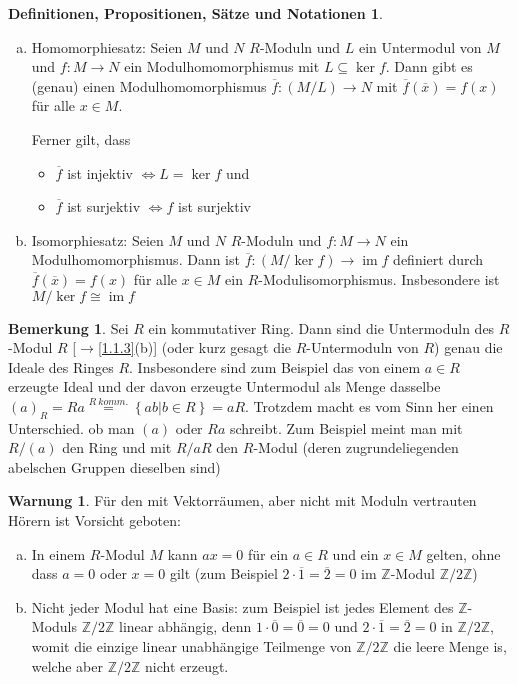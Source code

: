 \documentclass[
twoside=semi,
fontsize=12,
DIV=12, 
cleardoublepage=current,
leqno,
headings=optiontoheadandtoc, 
toc=idx
]{scrbook}
\newcommand{\Z}{\mathbb{Z}}
\newcommand{\set}[1]{\left\{ #1 \right\}}
\DeclareMathOperator{\im}{im}
\theoremstyle{definition}
\newtheorem{bemerkung}[definition]{Bemerkung}
\newtheorem{warnung}[definition]{Warnung}
\newtheorem{def-prop-satz-not}[definition]{Definitionen, Propositionen, S\"atze und Notationen}
\begin{document}
\begin{def-prop-satz-not}
\begin{enumerate}[(a)]
			\item Homomorphiesatz: Seien $M$ und $N$ $R$-Moduln und $L$ ein Untermodul von $M$ und $f:M \to N$ ein Modulhomomorphismus mit $L \subseteq \ker f$. Dann gibt es (genau) einen Modulhomomorphismus $\overline{f}: (M/L) \to N$ mit $\overline{f}(\overline{x}) = f(x)$ f\"ur alle $x \in M$.
			
			Ferner gilt, dass
			\begin{itemize}
				\item $\overline{f}$ ist injektiv $\Leftrightarrow L = \ker f$ und
				\item $\overline{f}$ ist surjektiv $\Leftrightarrow f$ ist surjektiv
			\end{itemize}
			
			\item Isomorphiesatz: Seien $M$ und $N$ $R$-Moduln und $f:M \to N$ ein Modulhomomorphismus. Dann ist $\overline{f}:(M/\ker f) \to \im f$ definiert durch $\overline{f}(\overline{x}) = f(x)$ f\"ur alle $x\in M$ ein $R$-Modulisomorphismus. Insbesondere ist $M/\ker f \cong \im f$
		\end{enumerate}
	\end{def-prop-satz-not}
	
	\begin{bemerkung}\label{1.1.5}
		Sei $R$ ein kommutativer Ring. Dann sind die Untermoduln des $R$-Modul $R$ [$\to$\ref{1.1.3}(b)] (oder kurz gesagt die $R$-Untermoduln von $R$) genau die Ideale des Ringes $R$.
		Insbesondere sind zum Beispiel das von einem $a \in R$ erzeugte Ideal und der davon erzeugte Untermodul als Menge dasselbe $(a)_R = Ra \overset{R\ komm.}{=} \set{ab | b \in R} = aR$.
		Trotzdem macht es vom Sinn her einen Unterschied. ob man $(a)$ oder $Ra$ schreibt. Zum Beispiel meint man mit $R/(a)$ den Ring und mit $R/aR$ den $R$-Modul (deren zugrundeliegenden abelschen Gruppen dieselben sind)
	\end{bemerkung}

	\begin{warnung}\label{1.1.6}
		F\"ur den mit Vektorr\"aumen, aber nicht mit Moduln vertrauten H\"orern ist Vorsicht geboten:
		\begin{enumerate}[(a)]
			\item In einem $R$-Modul $M$ kann $ax = 0$ f\"ur ein $a \in R$ und ein $x \in M$ gelten, ohne dass $a = 0$ oder $x = 0$ gilt (zum Beispiel $2 \cdot \overline{1} = \overline{2} = 0$ im $\Z$-Modul $\Z/2\Z$)
			
			\item Nicht jeder Modul hat eine Basis:
			zum Beispiel ist jedes Element des $\Z$-Moduls $\Z/2\Z$ linear abh\"angig, denn $1 \cdot \overline{0} = \overline{0} = 0$ und $2 \cdot \overline{1} = \overline{2} = 0$ in $\Z/2\Z$, womit die einzige linear unabh\"angige Teilmenge von $\Z/2\Z$ die leere Menge is, welche aber $\Z/2\Z$ nicht erzeugt.
		\end{enumerate}
	\end{warnung}	
\end{document}
